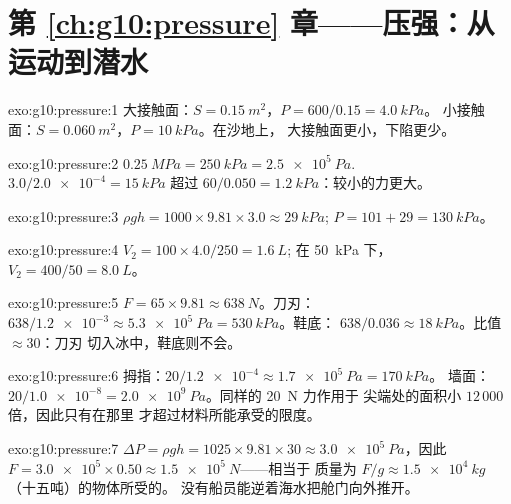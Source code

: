 \section*{第 \ref{ch:g10:pressure} 章——压强：从运动到潜水}

\begin{solution}{exo:g10:pressure:1}
大接触面：$S = \qty{0.15}{m^2}$，$P = 600/0.15 = \qty{4.0}{kPa}$。
小接触面：$S = \qty{0.060}{m^2}$，$P = \qty{10}{kPa}$。在沙地上，
大接触面更小，下陷更少。
\end{solution}

\begin{solution}{exo:g10:pressure:2}
$\qty{0.25}{MPa} = \qty{250}{kPa} = \qty{2.5e5}{Pa}$.
$3.0/\num{2.0e-4} = \qty{15}{kPa}$ 超过
$60/0.050 = \qty{1.2}{kPa}$：较小的力更大。
\end{solution}

\begin{solution}{exo:g10:pressure:3}
$\rho g h = 1000 \times 9.81 \times 3.0 \approx \qty{29}{kPa}$;
 $P = 101 + 29 = \qty{130}{kPa}$。
\end{solution}

\begin{solution}{exo:g10:pressure:4}
$V_2 = 100 \times 4.0 / 250 = \qty{1.6}{L}$;
在 \qty{50}{kPa} 下，$V_2 = 400/50 = \qty{8.0}{L}$。
\end{solution}

\begin{solution}{exo:g10:pressure:5}
$F = 65 \times 9.81 \approx \qty{638}{N}$。刀刃：
$638/\num{1.2e-3} \approx \qty{5.3e5}{Pa} = \qty{530}{kPa}$。鞋底：
$638/0.036 \approx \qty{18}{kPa}$。比值 $\approx 30$：刀刃
切入冰中，鞋底则不会。
\end{solution}

\begin{solution}{exo:g10:pressure:6}
拇指：$20/\num{1.2e-4} \approx \qty{1.7e5}{Pa} = \qty{170}{kPa}$。
墙面：$20/\num{1.0e-8} = \qty{2.0e9}{Pa}$。同样的 \qty{20}{N} 力作用于
尖端处的面积小 $12\,000$ 倍，因此只有在那里
才超过材料所能承受的限度。
\end{solution}

\begin{solution}{exo:g10:pressure:7}
$\Delta P = \rho g h = 1025 \times 9.81 \times 30 \approx
\qty{3.0e5}{Pa}$，因此
$F = \num{3.0e5} \times 0.50 \approx \qty{1.5e5}{N}$——相当于
质量为 $F/g \approx \qty{1.5e4}{kg}$（十五吨）的物体所受的。
没有船员能逆着海水把舱门向外推开。
\end{solution}

